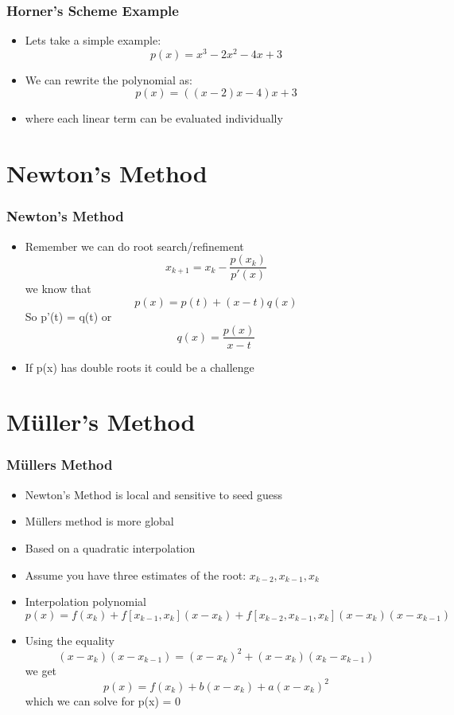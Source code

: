 \documentclass[10pt]{beamer}
\begin{document}
\begin{frame}
  \frametitle{Horner's Scheme Example}
  \begin{itemize}
    \item Lets take a simple example:
          \[
          p(x) = x^{3} - 2 x^{2} - 4 x + 3
          \]

    \item We can rewrite the polynomial as:
          \[ p(x) = ((x -2) x - 4) x +3 \]

    \item where each linear term can be evaluated individually
  \end{itemize}
\end{frame}

\section{Newton's Method}

\begin{frame}
  \frametitle{Newton's Method}
  \begin{itemize}
  \item Remember we can do root search/refinement
    \[
      x_{k+1} = x_k - \frac{p(x_k)}{p'(x)}
    \] we know that
    \[
      p(x) = p(t) + (x-t) q(x)
    \]
    So p'(t) = q(t) or
    \[
      q(x) = \frac{p(x)}{x-t}
    \]
  \item If p(x) has double roots it could be a challenge
  \end{itemize}
\end{frame}

\section{M{\"u}ller's Method}

\begin{frame}
  \frametitle{M\"ullers Method}
  \begin{itemize}
  \item Newton's Method is local and sensitive to seed guess    
  \item M\"ullers method is more global
  \item Based on a quadratic interpolation
  \item Assume you have three estimates of the root: $x_{k-2}, x_{k-1}, x_k$
  \item Interpolation polynomial
    \[
      p(x) = f(x_k)
      + f[x_{k-1}, x_k](x-x_k)
      + f[x_{k-2}, x_{k-1}, x_k](x-x_k)(x-x_{k-1})
    \]
  \item Using the equality
    \[
      (x-x_k)(x-x_{k-1}) = (x-x_k)^2 + (x-x_k)(x_k-x_{k-1})
    \] we get
    \[
      p(x) = f(x_k) + b (x-x_k) + a (x-x_k)^2
    \]
    which we can solve for p(x) = 0
  \end{itemize}
\end{frame}
\end{document}
